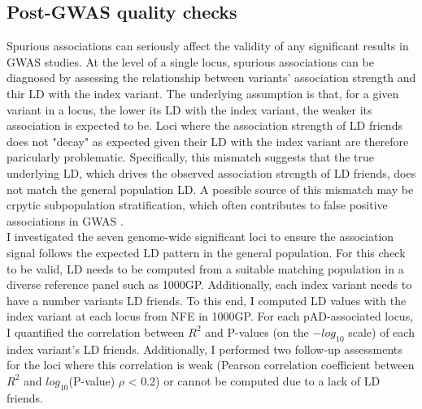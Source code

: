     \subsection{Post-GWAS quality checks}
    Spurious associations can seriously affect the validity of any significant results in GWAS studies. At the level of a single locus,  spurious associations can be diagnosed by assessing the relationship between variants' association strength and thir LD with the index variant. The underlying assumption is that, for a given variant in a locus, the lower its LD with the index variant, the weaker its association is expected to be. Loci where the association strength of LD friends does not "decay" as expected given their LD with the index variant are therefore paricularly problematic. Specifically, this mismatch suggests that the true underlying LD, which drives the observed association strength of LD friends, does not match the general population LD. A possible source of this mismatch may be crpytic subpopulation stratification, which often contributes to false positive associations in GWAS \cite{Hellwege2017-xf}. \\ 
    
    I investigated the seven genome-wide significant loci to ensure the association signal follows the expected LD pattern in the general population. For this check to be valid, LD needs to be computed from a suitable matching population in a diverse reference panel such as 1000GP. Additionally, each index variant needs to have a number variants LD friends. To this end, I computed LD values with the index variant at each locus from NFE in 1000GP. For each pAD-associated locus, I quantified the correlation between $R^{2}$ and P-values (on the $-log_{10}$ scale) of each index variant's LD friends. Additionally, I performed two follow-up assessments for the loci where this correlation is weak (Pearson correlation coefficient between $R^{2}$ and $log_{10}$(P-value) $\rho$ < 0.2) or cannot be computed due to a lack of LD friends. \\

    
    
